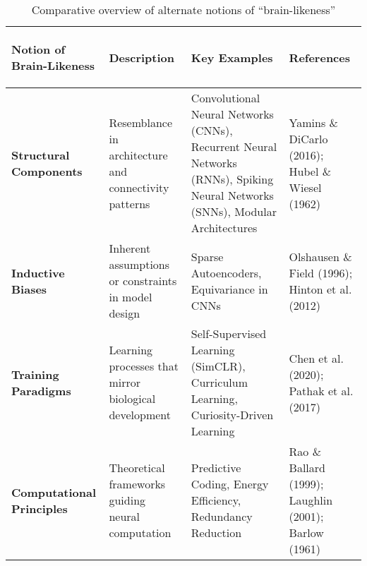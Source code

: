 \begin{table*}[t]
    \centering
    \caption{Comparative overview of alternate notions of ``brain-likeness''}
    \label{tab:brain_likeness}
    \begin{tabular}{>{\bfseries\raggedright\arraybackslash}m{2.5cm} >{\raggedright\arraybackslash}m{4.5cm} >{\raggedright\arraybackslash}m{5cm} >{\raggedright\arraybackslash}m{4cm}}
        \toprule
        \textbf{Notion of Brain-Likeness} & \textbf{Description} & \textbf{Key Examples} & \textbf{References} \\
        \midrule
        \textbf{Structural Components} & Resemblance in architecture and connectivity patterns & Convolutional Neural Networks (CNNs), Recurrent Neural Networks (RNNs), Spiking Neural Networks (SNNs), Modular Architectures & Yamins \& DiCarlo (2016); Hubel \& Wiesel (1962) \\
        
        \textbf{Inductive Biases} & Inherent assumptions or constraints in model design & Sparse Autoencoders, Equivariance in CNNs & Olshausen \& Field (1996); Hinton et al. (2012) \\
        
        \textbf{Training Paradigms} & Learning processes that mirror biological development & Self-Supervised Learning (SimCLR), Curriculum Learning, Curiosity-Driven Learning & Chen et al. (2020); Pathak et al. (2017) \\
        
        \textbf{Computational Principles} & Theoretical frameworks guiding neural computation & Predictive Coding, Energy Efficiency, Redundancy Reduction & Rao \& Ballard (1999); Laughlin (2001); Barlow (1961) \\
        \bottomrule
    \end{tabular}
\end{table*}


